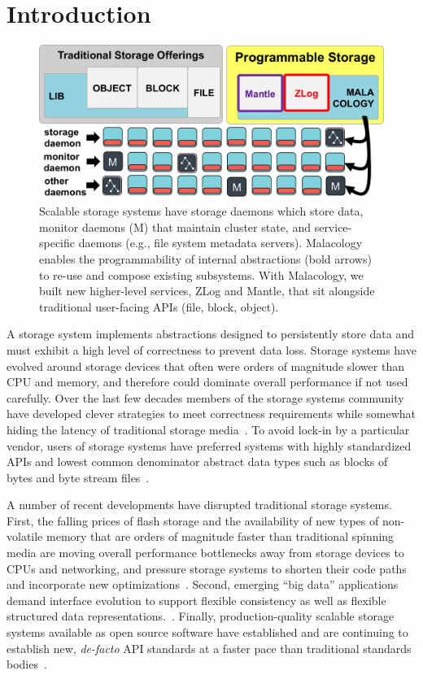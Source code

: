 \section{Introduction}
\label{introduction}
\label{sec:intro}

\begin{figure}[tb]
\centering
\includegraphics{figures/overview.png}
\caption{Scalable storage systems have storage daemons which store data,
monitor daemons (M) that maintain cluster state, and service-specific daemons
(e.g., file system metadata servers). Malacology enables the programmability of
internal abstractions (bold arrows) to re-use and compose
existing subsystems.  With Malacology, we built new higher-level services, ZLog and
Mantle, that sit alongside traditional user-facing APIs (file, block,
object).}\label{fig:overview}
\end{figure}

A storage system implements abstractions designed to persistently store data
and must exhibit a high level of correctness to prevent data loss.  Storage
systems have evolved around storage devices that often were orders of magnitude
slower than CPU and memory, and therefore could dominate overall performance if
not used carefully. Over the last few decades members of the storage systems
community have developed clever strategies to meet correctness requirements
while somewhat hiding the latency of traditional storage
media~\cite{brewer_disks_2016}. To avoid lock-in by a particular vendor, users
of storage systems have preferred systems with highly standardized APIs and
lowest common denominator abstract data types such as blocks of bytes and byte
stream files~\cite{armbrust_view_2010}.

A number of recent developments have disrupted traditional storage systems.
First, the falling prices of flash storage and the availability of new types of
non-volatile memory that are orders of magnitude faster than traditional
spinning media are moving overall performance bottlenecks away from storage
devices to CPUs and networking, and pressure storage systems to shorten their
code paths and incorporate new
optimizations~\cite{gray_tape_2007,gray_flash_2008}.  Second, emerging ``big
data'' applications demand interface evolution to support flexible consistency
as well as flexible structured data
representations.~\cite{apache_contributors_parquet_2014}.  Finally,
production-quality scalable storage systems available as open source software
have established and are continuing to establish new, \emph{de-facto} API
standards at a faster pace than traditional standards
bodies~\cite{snia_implementing_2014,linux_foundation_kinetic_2015}.

